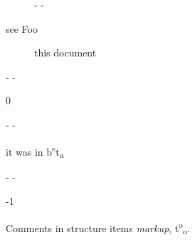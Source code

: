\begin{description}\kern-\topsep
\makeatletter\advance\@topsepadd-\topsep\makeatother%
\item[see Foo]{\begin{flushleft}\end{flushleft}%
this document

}\end{description}%
\begin{description}\kern-\topsep
\makeatletter\advance\@topsepadd-\topsep\makeatother%
\item[{since}]{0}\end{description}%
\begin{description}\kern-\topsep
\makeatletter\advance\@topsepadd-\topsep\makeatother%
\item[before 1.0]{\begin{flushleft}\end{flushleft}%
it was in b\textsuperscript{e}t\textsubscript{a}

}\end{description}%
\begin{description}\kern-\topsep
\makeatletter\advance\@topsepadd-\topsep\makeatother%
\item[version]{-1}\end{description}%
\label{container-page-test+u+package+++ml-module-Markup-val-foo}\begin{ocamlindent}\begin{flushleft}\end{flushleft}%
Comments in structure items  \emph{markup}, t\textsuperscript{o}\textsubscript{o}.\end{ocamlindent}%
\medbreak


